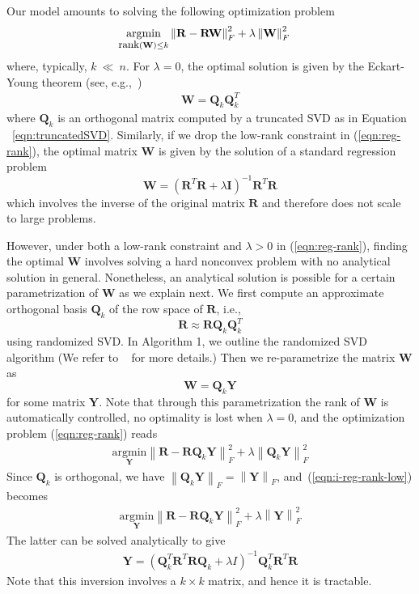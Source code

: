 \documentclass{article}
\newcommand{\citep}{\cite}
\newcommand{\R}{\mathbf{R}}
\newcommand{\I}{\mathbf{I}}
\newcommand{\Q}{\mathbf{Q}}
\newcommand{\W}{\mathbf{W}}
\newcommand{\Y}{\mathbf{Y}}
\begin{document}
Our model amounts to solving the following optimization problem
 \begin{align}
\label{eqn:reg-rank}
\underset{\mbox{\footnotesize rank}(\W) \le k}{\mathrm{argmin}} & \left \| \R - \R\W\right \|_F^2 + \lambda \left \|  \W \right \|_F^2
\end{align}
where, typically, $k\ \ll \ n$.
For $\lambda = 0$, the optimal solution is given by the Eckart-Young theorem (see, e.g.,~\citep{halko2011})
   \begin{align}
   \label{eqn:SVDOptimal}
   \W = \Q_k \Q_k^ T
   \end{align}
where  $\Q_k$ is an orthogonal matrix computed by a truncated SVD as in Equation ~\ref{eqn:truncatedSVD}.
Similarly, if we drop the low-rank constraint in (\ref{eqn:reg-rank}), the optimal matrix $\W$ is given by the solution of a standard regression problem
\begin{equation}
\W = (\R^T \R + \lambda \I)^{-1} \R^T \R
\end{equation}
which involves the inverse of the original matrix $\R$ and therefore does not scale to large problems.

However, under both a low-rank constraint and $\lambda > 0$ in (\ref{eqn:reg-rank}), finding the optimal $\W$ involves solving a hard nonconvex problem with no analytical solution in general. Nonetheless, an analytical solution is possible for a certain parametrization of $\W$ as we explain next. We first compute an approximate orthogonal basis $\Q_k$ of the row space of $\R$, i.e.,
\begin{equation}
\R \approx \R \Q_k \Q_k^T
\end{equation}
using randomized SVD. In Algorithm 1, we outline the randomized SVD algorithm (We refer to ~\citep{halko2011} for more details.)
Then we re-parametrize the matrix $\W$ as
\begin{equation}
\W = \Q_k \Y
\end{equation}
for some matrix $\Y$. Note that through this parametrization the rank of $\W$ is automatically controlled, no optimality is lost when $\lambda=0$, and the optimization problem (\ref{eqn:reg-rank}) reads
\begin{align}
\label{eqn:i-reg-rank-low}
\underset{\Y} {\mathrm{argmin}}  \left \| \R - \R \Q_k \Y \right \|_F^2 + \lambda \left \|  \Q_k \Y \right \|_F^2
\end{align}
Since $\Q_k$ is orthogonal, we have $\left \| \Q_k \Y \right \|_F = \left \|\Y\right \|_F$, and~(\ref{eqn:i-reg-rank-low}) becomes
\begin{align}
\underset{\Y}{\mathrm{argmin}} \left \| \R - \R\Q_k\Y\right \|_F^2 + \lambda \left \|  \Y \right \|_F^2
\end{align}
The latter can be solved analytically to give
\begin{align*}
\Y = (\Q_k^T \R^T\R\Q_k +\lambda I)^{-1} \Q_k^T \R^T \R
\end{align*}
Note that this inversion involves a $k \times k$ matrix, and hence it is tractable.
\end{document}
